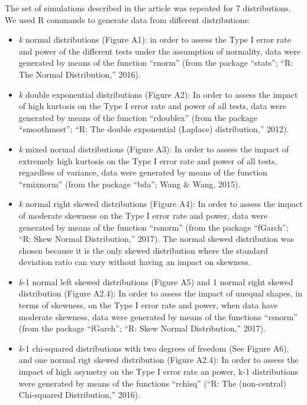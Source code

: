 \documentclass[
]{article}
\begin{document}
The set of simulations described in the article was repeated for 7
distributions. We used R commands to generate data from different
distributions:

\begin{itemize}
\item
  \emph{k} normal distributions (Figure A1): in order to assess the Type
  I error rate and power of the different tests under the assumption of
  normality, data were generated by means of the function ``rnorm''
  (from the package ``stats''; ``R: The Normal Distribution,'' 2016).
\item
  \emph{k} double exponential distributions (Figure A2): In order to
  assess the impact of high kurtosis on the Type I error rate and power
  of all tests, data were generated by means of the function
  ``rdoublex'' (from the package ``smoothmest''; ``R: The double
  exponential (Laplace) distribution,'' 2012).
\item
  \emph{k} mixed normal distributions (Figure A3): In order to assess
  the impact of extremely high kurtosis on the Type I error rate and
  power of all tests, regardless of variance, data were generated by
  means of the function ``rmixnorm'' (from the package ``bda''; Wang \&
  Wang, 2015).
\item
  \emph{k} normal right skewed distributions (Figure A4): In order to
  assess the impact of moderate skewness on the Type I error rate and
  power, data were generated by means of the function ``rsnorm'' (from
  the package ``fGarch''; ``R: Skew Normal Distribution,'' 2017). The
  normal skewed distribution was chosen because it is the only skewed
  distribution where the standard deviation ratio can vary without
  having an impact on skewness.
\item
  \emph{k}-1 normal left skewed distributions (Figure A5) and 1 normal
  right skewed distribution (Figure A2.4): In order to assess the impact
  of unequal shapes, in terms of skewness, on the Type I error rate and
  power, when data have moderate skewness, data were generated by means
  of the functions ``rsnorm'' (from the package ``fGarch''; ``R: Skew
  Normal Distribution,'' 2017).
\item
  \emph{k}-1 chi-squared distributions with two degrees of freedom (See
  Figure A6), and one normal rigt skewed distribution (Figure A2.4): In
  order to assess the impact of high asymetry on the Type I error rate
  an power, k-1 distributions were generated by means of the functions
  ``rchisq'' (``R: The (non-central) Chi-squared Distribution,'' 2016).

\end{itemize}
\end{document}
